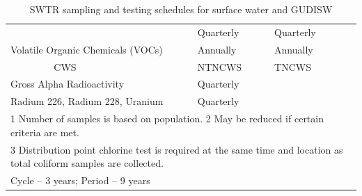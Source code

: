 \documentclass{article}
\begin{document}
\begin{table}[h!]
\begin{tabular}{|lllll|}
\multicolumn{2}{|l|}{}                                                                                               & \multicolumn{1}{l|}{Quarterly}                   & \multicolumn{1}{l|}{Quarterly}                      &                            \\ \cline{3-5} 
\multicolumn{2}{|l|}{\multirow{-2}{*}{Volatile Organic Chemicals (VOCs)}}                                            & \multicolumn{1}{l|}{Annually}                    & \multicolumn{1}{l|}{Annually}                       &                            \\ \hline
\rowcolor[HTML]{CBCEFB} 
\multicolumn{2}{|l|}{\cellcolor[HTML]{CBCEFB}Radionuclides}                                                          & \multicolumn{1}{l|}{\cellcolor[HTML]{CBCEFB}CWS} & \multicolumn{1}{l|}{\cellcolor[HTML]{CBCEFB}NTNCWS} & TNCWS                      \\ \hline
\multicolumn{2}{|l|}{Gross Alpha Radioactivity}                                                                      & \multicolumn{1}{l|}{Quarterly}                   & \multicolumn{1}{l|}{}                               &                            \\ \hline
\multicolumn{2}{|l|}{Radium 226, Radium 228, Uranium}                                                                & \multicolumn{1}{l|}{Quarterly}                   & \multicolumn{1}{l|}{}                               &                            \\ \hline
\multicolumn{5}{|l|}{1 Number of samples is based   on population. 2 May be   reduced if certain criteria are met.}                                                                                                                                        \\ \hline
\multicolumn{5}{|l|}{3 Distribution point chlorine   test is required at the same time and location as total coliform samples are   collected.}                                                                                                            \\ \hline
\multicolumn{5}{|l|}{Cycle – 3 years; Period – 9 years}                                                                                                                                                                                                    \\ \hline
\end{tabular}
\caption{SWTR sampling and testing schedules for surface water and GUDISW}

\end{table}
\end{document}
